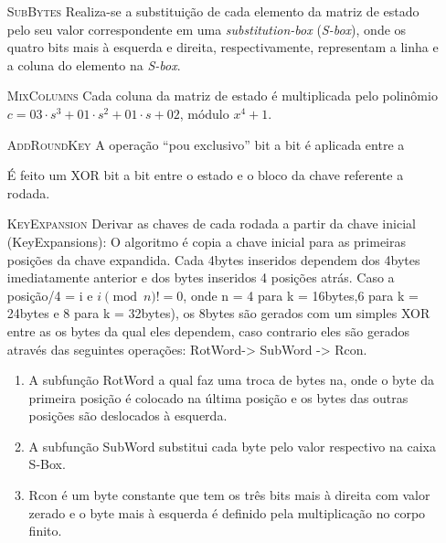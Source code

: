 \documentclass{article}
\begin{document}
\begin{enumerate}
    
    \item[\textsc{SubBytes}] Realiza-se a substituição de cada elemento da matriz de estado pelo seu valor correspondente em uma \emph{substitution-box} (\emph{S-box}), onde os quatro bits mais à esquerda e direita, respectivamente, representam a linha e a coluna do elemento na
    \emph{S-box}.
    
    \item[\textsc{MixColumns}] Cada coluna da matriz de estado é multiplicada pelo polinômio
        $c = 03 \cdot s^{3} + 01 \cdot s^{2} + 01 \cdot s + 02$, módulo $x^{4} + 1$.
        
    \item[\textsc{AddRoundKey}] A operação ``pou exclusivo'' bit a bit é aplicada entre a 
    
    É feito um XOR bit a bit entre o estado e o bloco da chave referente a rodada.
    
    \item[\textsc{KeyExpansion}] Derivar as chaves de cada rodada a partir da chave inicial (KeyExpansions): O algoritmo é copia a chave inicial para as primeiras posições da chave expandida. Cada 4bytes inseridos dependem dos 4bytes imediatamente anterior e dos bytes inseridos 4 posições atrás. Caso a posição/4 = i e $i \pmod{n} != 0$, onde n = 4 para k = 16bytes,6 para k = 24bytes e 8 para k = 32bytes), os 8bytes são gerados com um simples XOR entre as os bytes da qual eles dependem, caso contrario eles são gerados através das seguintes operações: RotWord-> SubWord -> Rcon. 
    \begin{enumerate}
        \item A subfunção RotWord a qual faz uma troca de bytes na, onde o byte da primeira posição é colocado na última posição e os bytes das outras posições são deslocados à esquerda. 
        \item A subfunção SubWord substitui cada byte pelo valor respectivo na caixa S-Box. 
        \item Rcon é um byte constante que tem os três bits mais à direita com valor zerado e o byte mais à esquerda é definido pela multiplicação no corpo finito.
    \end{enumerate} 

\end{enumerate}
\end{document}
